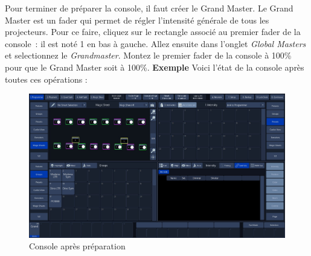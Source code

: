Pour terminer de préparer la console, il faut créer le Grand Master.
Le Grand Master est un fader qui permet de régler l'intensité générale de tous les projecteurs.
\newline
Pour ce faire, cliquez sur le rectangle associé au premier fader de la console~: il est noté 1 en bas à gauche.
\newline
Allez ensuite dans l'onglet \textit{Global Masters} et selectionnez le \textit{Grandmaster}.
\newline
\newline
Montez le premier fader de la console à 100\% pour que le Grand Master soit à 100\%.
\newline
\newline
\textbf{Exemple}
\newline
\newline
Voici l'état de la console après toutes ces opérations :
\begin{figure}[H]
    \centering
    \includegraphics[width=\textwidth]{3 - Encoder la Chimp/Images/prep_final.jpg}
    \caption{Console après préparation}
    \label{fig:prep_finale}
\end{figure}
